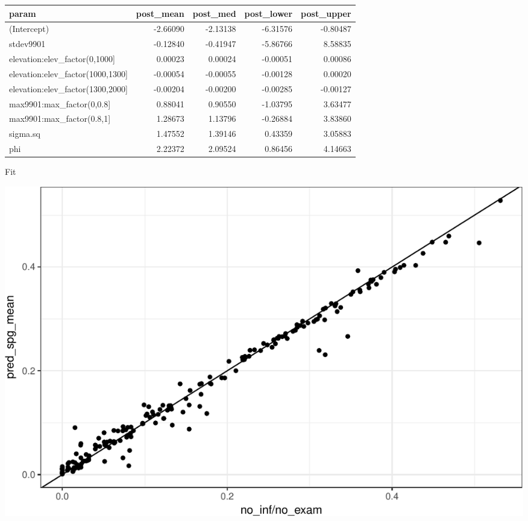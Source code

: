\documentclass[11pt,ignorenonframetext,]{beamer}
\begin{document}
\begin{frame}{}
\protect\hypertarget{section-2}{}

\footnotesize

\begin{longtable}[]{@{}lrrrr@{}}
\toprule
param & post\_mean & post\_med & post\_lower &
post\_upper\tabularnewline
\midrule
\endhead
(Intercept) & -2.66090 & -2.13138 & -6.31576 & -0.80487\tabularnewline
stdev9901 & -0.12840 & -0.41947 & -5.86766 & 8.58835\tabularnewline
elevation:elev\_factor(0,1000{]} & 0.00023 & 0.00024 & -0.00051 &
0.00086\tabularnewline
elevation:elev\_factor(1000,1300{]} & -0.00054 & -0.00055 & -0.00128 &
0.00020\tabularnewline
elevation:elev\_factor(1300,2000{]} & -0.00204 & -0.00200 & -0.00285 &
-0.00127\tabularnewline
max9901:max\_factor(0,0.8{]} & 0.88041 & 0.90550 & -1.03795 &
3.63477\tabularnewline
max9901:max\_factor(0.8,1{]} & 1.28673 & 1.13796 & -0.26884 &
3.83860\tabularnewline
sigma.sq & 1.47552 & 1.39146 & 0.43359 & 3.05883\tabularnewline
phi & 2.22372 & 2.09524 & 0.86456 & 4.14663\tabularnewline
\bottomrule
\end{longtable}

\end{frame}

\begin{frame}{Fit}
\protect\hypertarget{fit-1}{}

\begin{center}\includegraphics[width=\textwidth]{Lec20_files/figure-beamer/unnamed-chunk-17-1} \end{center}

\end{frame}
\end{document}
